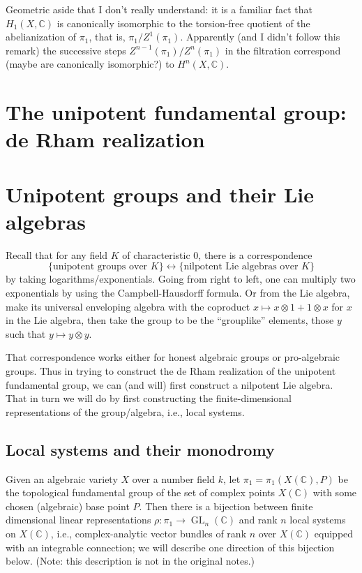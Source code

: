 \documentclass[12pt]{article}
\def\CC{\mathbb{C}}
\DeclareMathOperator{\GL}{GL}
\begin{document}
Geometric aside that I don't really understand:
it is a familiar fact that $H_1(X, \CC)$ is canonically isomorphic to
the torsion-free quotient of the abelianization of $\pi_1$, that is,
$\pi_1/Z^1(\pi_1)$. Apparently (and I didn't follow this remark) the 
successive steps $Z^{n-1}(\pi_1)/Z^n(\pi_1)$ in the filtration 
correspond (maybe are canonically isomorphic?) to $H^n(X, \CC)$.

\section{The unipotent fundamental group: de Rham realization}

\section*{Unipotent groups and their Lie algebras}

Recall that for any field $K$ of characteristic 0, there is a
correspondence
\[
\{ \mbox{unipotent groups over $K$} \}
\leftrightarrow \{ \mbox{nilpotent Lie algebras over $K$} \}
\]
by taking logarithms/exponentials. Going from right to left,
one can multiply two exponentials by using the Campbell-Hausdorff formula.
Or from the Lie algebra, make its universal enveloping algebra with
the coproduct $x \mapsto x \otimes 1 + 1 \otimes x$ for $x$ in the Lie
algebra, then take the group to be the ``grouplike'' elements,
those $y$ such that $y \mapsto y \otimes y$.

That correspondence works either for honest algebraic groups or pro-algebraic
groups. Thus in trying to construct the de Rham realization of the
unipotent fundamental group, we can (and will) first construct a nilpotent
Lie algebra. That in turn we will do by first constructing 
the finite-dimensional representations of the group/algebra, i.e.,
local systems.

\subsection*{Local systems and their monodromy}

Given an algebraic variety $X$ over a number field $k$, let $\pi_1
= \pi_1(X(\CC), P)$ be the topological fundamental group of the set
of complex points $X(\CC)$ with some chosen (algebraic) base point $P$.
Then there is a bijection between finite dimensional linear representations
$\rho: \pi_1 \to \GL_n(\CC)$ and rank $n$ local systems on $X(\CC)$,
i.e., complex-analytic vector bundles of rank $n$ over $X(\CC)$ equipped
with an integrable connection; we will describe one direction of
this bijection below. (Note: this
description is not in the original notes.)
\end{document}
